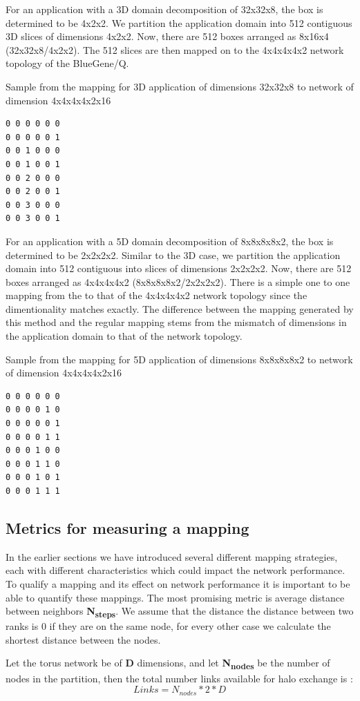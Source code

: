 \documentclass{acm_proc_article-sp}
\begin{document}
For an application with a 3D domain decomposition of 32x32x8, the box is determined to be 4x2x2. We partition the application domain
into 512 contiguous 3D slices of dimensions 4x2x2. Now, there are 512 boxes arranged as 8x16x4 (32x32x8/4x2x2).
The 512 slices are then mapped on to the 4x4x4x4x2 network topology of the BlueGene/Q.

Sample from the mapping for 3D application of dimensions 32x32x8 to network of dimension 4x4x4x4x2x16
\begin{lstlisting}
0 0 0 0 0 0
0 0 0 0 0 1
0 0 1 0 0 0
0 0 1 0 0 1
0 0 2 0 0 0
0 0 2 0 0 1
0 0 3 0 0 0
0 0 3 0 0 1
\end{lstlisting}

For an application with a 5D domain decomposition of 8x8x8x8x2, the box is determined to be 2x2x2x2. Similar to the 3D case, we
partition the application domain into 512 contiguous into  slices of dimensions 2x2x2x2.
Now, there are 512 boxes arranged as 4x4x4x4x2 (8x8x8x8x2/2x2x2x2). There is a simple one to one mapping from the
to that of the 4x4x4x4x2 network topology since the dimentionality matches exactly. The difference between the mapping
generated by this method and the regular mapping stems from the mismatch of dimensions in the application domain to that
of the network topology.

Sample from the mapping for 5D application of dimensions 8x8x8x8x2 to network of dimension 4x4x4x4x2x16
\begin{lstlisting}
0 0 0 0 0 0
0 0 0 0 1 0
0 0 0 0 0 1
0 0 0 0 1 1
0 0 0 1 0 0
0 0 0 1 1 0
0 0 0 1 0 1
0 0 0 1 1 1
\end{lstlisting}

\subsection{Metrics for measuring a mapping}

In the earlier sections we have introduced several different mapping strategies, each with different characteristics which could
impact the network performance. To qualify a mapping and its effect on network performance it is important to be able to quantify
these mappings. The most promising metric is average distance between neighbors \textbf{N\textsubscript{steps}}.
We assume that the distance the distance between two ranks is 0 if they are on the same node, for every other case we calculate
the shortest distance between the nodes.

Let the torus network be of \textbf{D} dimensions, and let \textbf{N\textsubscript{nodes}} be the number of nodes in the partition, then
the total number links available for halo exchange is :
\begin{equation}
  Links = N_{nodes} * 2 * D
\end{equation}
\end{document}
